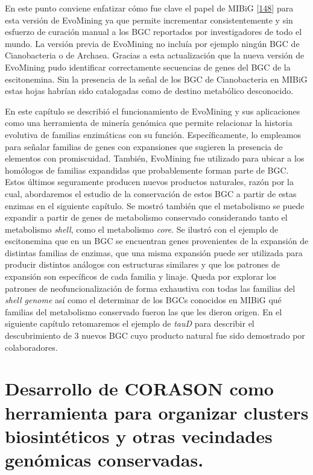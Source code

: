 \documentclass[12pt,twoside]{reedthesis}
\begin{document}
  En este punto conviene enfatizar cómo fue clave el papel de MIBiG
  {[}\protect\hyperlink{ref-medema_minimum_2015}{148}{]} para esta versión
  de EvoMining ya que permite incrementar consistentemente y sin esfuerzo
  de curación manual a los BGC reportados por investigadores de todo el
  mundo. La versión previa de EvoMining no incluía por ejemplo ningún BGC
  de Cianobacteria o de Archaea. Gracias a esta actualización que la nueva
  versión de EvoMining pudo identificar correctamente secuencias de genes
  del BGC de la escitonemina. Sin la presencia de la señal de los BGC de
  Cianobacteria en MIBiG estas hojas habrían sido catalogadas como de
  destino metabólico desconocido.
  
  En este capítulo se describió el funcionamiento de EvoMining y sus
  aplicaciones como una herramienta de minería genómica que permite
  relacionar la historia evolutiva de familias enzimáticas con su función.
  Específicamente, lo empleamos para señalar familias de genes con
  expansiones que sugieren la presencia de elementos con promiscuidad.
  También, EvoMining fue utilizado para ubicar a los homólogos de familias
  expandidas que probablemente forman parte de BGC. Estos últimos
  seguramente producen nuevos productos naturales, razón por la cual,
  abordaremos el estudio de la conservación de estos BGC a partir de estas
  enzimas en el siguiente capítulo. Se mostró también que el metabolismo
  se puede expandir a partir de genes de metabolismo conservado
  considerando tanto el metabolismo \emph{shell}, como el metabolismo
  \emph{core}. Se ilustró con el ejemplo de escitonemina que en un BGC se
  encuentran genes provenientes de la expansión de distintas familias de
  enzimas, que una misma expansión puede ser utilizada para producir
  distintos análogos con estructuras similares y que los patrones de
  expansión son específicos de cada familia y linaje. Queda por explorar
  los patrones de neofuncionalización de forma exhaustiva con todas las
  familias del \emph{shell genome} así como el determinar de los BGCs
  conocidos en MIBiG qué familias del metabolismo conservado fueron las
  que les dieron origen. En el siguiente capítulo retomaremos el ejemplo
  de \emph{tauD} para describir el descubrimiento de 3 nuevos BGC cuyo
  producto natural fue sido demostrado por colaboradores.
  
  \chapter{Desarrollo de CORASON como herramienta para organizar clusters
  biosintéticos y otras vecindades genómicas
  conservadas.}\label{desarrollo-de-corason-como-herramienta-para-organizar-clusters-biosinteticos-y-otras-vecindades-genomicas-conservadas.}
  
\end{document}
